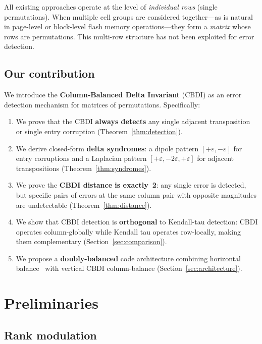 \documentclass[11pt]{article}
\begin{document}
All existing approaches operate at the level of \emph{individual rows} (single permutations). When multiple cell groups are considered together---as is natural in page-level or block-level flash memory operations---they form a \emph{matrix} whose rows are permutations. This multi-row structure has not been exploited for error detection.

\subsection{Our contribution}

We introduce the \textbf{Column-Balanced Delta Invariant} (CBDI) as an error detection mechanism for matrices of permutations. Specifically:

\begin{enumerate}
\item We prove that the CBDI \textbf{always detects} any single adjacent transposition or single entry corruption (Theorem~\ref{thm:detection}).
\item We derive closed-form \textbf{delta syndromes}: a dipole pattern $[+\varepsilon, -\varepsilon]$ for entry corruptions and a Laplacian pattern $[+\varepsilon, -2\varepsilon, +\varepsilon]$ for adjacent transpositions (Theorem~\ref{thm:syndromes}).
\item We prove the \textbf{CBDI distance is exactly~2}: any single error is detected, but specific pairs of errors at the same column pair with opposite magnitudes are undetectable (Theorem~\ref{thm:distance}).
\item We show that CBDI detection is \textbf{orthogonal} to Kendall-tau detection: CBDI operates column-globally while Kendall tau operates row-locally, making them complementary (Section~\ref{sec:comparison}).
\item We propose a \textbf{doubly-balanced} code architecture combining horizontal balance~\cite{gabrys2016} with vertical CBDI column-balance (Section~\ref{sec:architecture}).
\end{enumerate}

\section{Preliminaries}

\subsection{Rank modulation}
\end{document}
